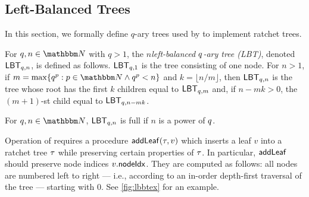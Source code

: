 
\subsection{Left-Balanced Trees}\label{sec:addleafprf}
In this section, we formally define $q$-ary trees used by \saik to implement ratchet trees.

\begin{definition}[LBT]\label{def:lbt}
	For $\treeArity,n\in\N$ with $q>1$, the \emph{$n$\th left-balanced $q$-ary tree (LBT)}, denoted ${\mathsf{LBT}}_{q,n}$, is defined as follows. ${\mathsf{LBT}}_{q,1}$ is the tree consisting of one node.
	For $n>1$, if $m = \max\{\treeArity^p : p \in \N \land \treeArity^p < n\}$ and $k = \lfloor n/m \rfloor$, then ${\mathsf{LBT}}_{q,n}$ is the tree whose root has the first $k$ children equal to  ${\mathsf{LBT}}_{q,m}$ and, if $n-mk>0$, the $(m+1)$-st child equal to ${\mathsf{LBT}}_{q,n-mk}$.
\end{definition}
\begin{definition}
  For $\treeArity,n\in\N$, ${\mathsf{LBT}}_{q,n}$ is full if $n$ is a power of $q$.
\end{definition}

Operation of \saik requires a procedure ${\mathsf{addLeaf}}(\tau, v)$ which inserts a leaf $v$ into a ratchet tree $\tau$ while preserving certain properties of $\tau$. In particular, ${\mathsf{addLeaf}}$ should preserve node indices $v.{\mathsf{nodeIdx}}$. They are computed as follows: all nodes are numbered left to right --- i.e., according to an in-order depth-first traversal of the tree ---  starting with $0$. See \cref{fig:lbbtex} for an example.

